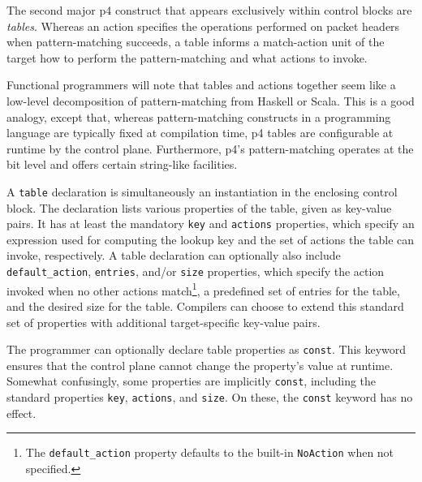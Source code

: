 The second major \acrshort{p4} construct that appears exclusively within control
blocks are \emph{tables}. Whereas an action specifies the operations performed
on packet headers when pattern-matching succeeds, a table informs a match-action
unit of the target how to perform the pattern-matching and what actions to
invoke.

\begin{tcolorbox}[
	title={\textbf{Analogy to functional programming}},
	colback=decoration!5!white,
	colframe=decoration,
	fonttitle=\bfseries,
	arc=0pt,
	outer arc=0pt,
	boxrule=0.5pt,
	top=2pt,
	bottom=2pt,
	left=2pt,
	right=2pt,
	enlarge top by=1.5\baselineskip,
	enlarge bottom by=1.5\baselineskip
]
	Functional programmers will note that tables and actions together seem like
	a low-level decomposition of pattern-matching from Haskell or Scala. This is
	a good analogy, except that, whereas pattern-matching constructs in a
	programming language are typically fixed at compilation time, \acrshort{p4}
	tables are configurable at runtime by the control plane. Furthermore,
	\acrshort{p4}'s pattern-matching operates at the bit level and offers
	certain string-like facilities.
\end{tcolorbox}

A \texttt{table} declaration is simultaneously an instantiation in the enclosing
control block. The declaration lists various properties of the table, given as
key-value pairs. It has at least the mandatory \texttt{key} and \texttt{actions}
properties, which specify an expression used for computing the lookup key and
the set of actions the table can invoke, respectively. A table declaration can
optionally also include \texttt{default\_action}, \texttt{entries}, and/or
\texttt{size} properties, which specify the action invoked when no other actions
match\footnote{The \texttt{default\_action} property defaults to the built-in
\texttt{NoAction} when not specified.}, a predefined set of entries for the
table, and the desired size for the table. Compilers can choose to extend this
standard set of properties with additional target-specific key-value pairs.

The programmer can optionally declare table properties as \texttt{const}. This
keyword ensures that the control plane cannot change the property's value at
runtime. Somewhat confusingly, some properties are implicitly \texttt{const},
including the standard properties \texttt{key}, \texttt{actions}, and
\texttt{size}. On these, the \texttt{const} keyword has no effect.

